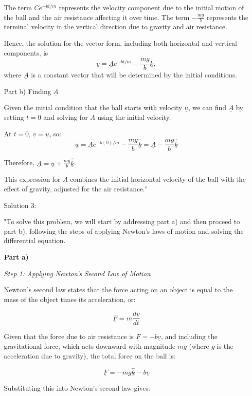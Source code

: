 The term \(Ce^{-bt/m}\) represents the velocity component due to the initial motion of the ball and the air resistance affecting it over time. The term \(-\frac{mg}{b}\) represents the terminal velocity in the vertical direction due to gravity and air resistance.

Hence, the solution for the vector form, including both horizontal and vertical components, is
\[
\underline{v} = \underline{A} e^{-bt/m} - \frac{mg}{b} \hat{\underline{k}},
\]
where \( \underline{A} \) is a constant vector that will be determined by the initial conditions.

Part b) Finding \( \underline{A} \)

Given the initial condition that the ball starts with velocity \( \underline{u} \), we can find \( \underline{A} \) by setting \( t = 0 \) and solving for \( \underline{A} \) using the initial velocity.

At \( t = 0 \), \( \underline{v} = \underline{u} \), so:
\[
\underline{u} = \underline{A} e^{-b(0)/m} - \frac{mg}{b} \hat{\underline{k}} = \underline{A} - \frac{mg}{b} \hat{\underline{k}}
\]

Therefore, \( \underline{A} = \underline{u} + \frac{mg}{b} \hat{\underline{k}} \).

This expression for \( \underline{A} \) combines the initial horizontal velocity of the ball with the effect of gravity, adjusted for the air resistance."

Solution 3:

"To solve this problem, we will start by addressing part a) and then proceed to part b), following the steps of applying Newton's laws of motion and solving the differential equation.

\textbf{Part a)}

\textit{Step 1: Applying Newton's Second Law of Motion}

Newton's second law states that the force acting on an object is equal to the mass of the object times its acceleration, or:

\[ \underline{F} = m \frac{d\underline{v}}{dt} \]

Given that the force due to air resistance is \(\underline{F} = -b\underline{v}\), and including the gravitational force, which acts downward with magnitude \(mg\) (where \(g\) is the acceleration due to gravity), the total force on the ball is:

\[ \underline{F} = - mg \hat{\underline{k}} - b\underline{v} \]

Substituting this into Newton's second law gives:

